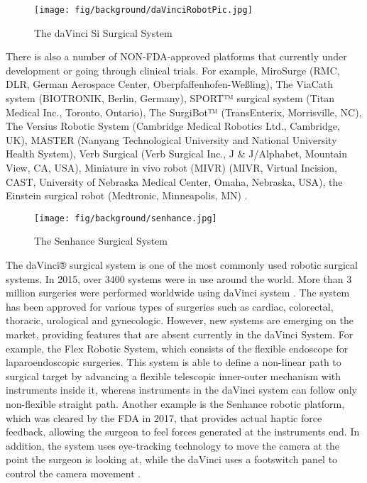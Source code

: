 \begin{figure}[h]
	\begin{center}
	\texttt{[image: fig/background/daVinciRobotPic.jpg]}
	\end{center}
	\vspace{-4mm}
	\caption[The daVinci Si Surgical System]
	{The daVinci Si Surgical System \cite{_intuitive_2018}}
	\label{fig:daVinci}
	\vspace{-2mm}
\end{figure}

There is also a number of NON-FDA-approved platforms that currently under development or going through clinical trials. For example, MiroSurge (RMC, DLR, German Aerospace Center, Oberpfaffenhofen-Weßling), The ViaCath system (BIOTRONIK, Berlin, Germany), SPORT™ surgical system (Titan Medical Inc., Toronto, Ontario), The SurgiBot™ (TransEnterix, Morrisville, NC), The Versius Robotic System (Cambridge Medical Robotics Ltd., Cambridge, UK), MASTER (Nanyang Technological University and National University Health System), Verb Surgical (Verb Surgical Inc., J \& J/Alphabet, Mountain View, CA, USA), Miniature in vivo robot (MIVR) (MIVR, Virtual Incision, CAST, University of Nebraska Medical Center, Omaha, Nebraska, USA), the Einstein surgical robot (Medtronic, Minneapolis, MN) \cite{peters_review_2018}.

\begin{figure}[h]
	\begin{center}
	\texttt{[image: fig/background/senhance.jpg]}
	\end{center}
	\vspace{-4mm}
	\caption[The Senhance Surgical System]
	{The Senhance Surgical System \cite{_senhance}}
	\label{fig:Senhance}
	\vspace{-2mm}
\end{figure}

The daVinci® surgical system is one of the most commonly used robotic surgical systems. In 2015, over 3400 systems were in use around the world. More than 3 million surgeries were performed worldwide using daVinci system \cite{_intuitive_2018}. The system has been approved for various types of surgeries such as cardiac, colorectal, thoracic, urological and gynecologic. However, new systems are emerging on the market, providing features that are absent currently in the daVinci System. For example, the Flex Robotic System, which consists of the flexible endoscope for laparoendoscopic surgeries. This system is able to define a non-linear path to surgical target by advancing a flexible telescopic inner-outer mechanism with instruments inside it, whereas instruments in the daVinci system can follow only non-flexible straight path. Another example is the Senhance robotic platform, which was cleared by the FDA in 2017, that provides actual haptic force feedback, allowing the surgeon to feel forces generated at the instruments end. In addition, the system uses eye-tracking technology to move the camera at the point the surgeon is looking at, while the daVinci uses a footswitch panel to control the camera movement \cite{peters_review_2018}.

